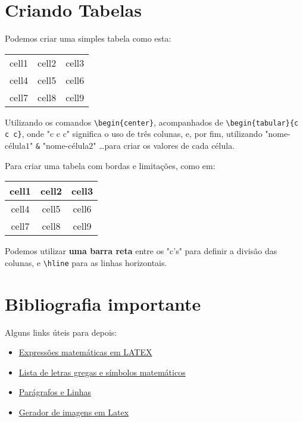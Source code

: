 \documentclass[12pt, a4paper]{article}
\begin{document}
\section{Criando Tabelas}
Podemos criar uma simples tabela como esta:
\begin{center}
\begin{tabular}{c c c}
 cell1 & cell2 & cell3 \\ 
 cell4 & cell5 & cell6 \\  
 cell7 & cell8 & cell9    
\end{tabular}
\end{center}
Utilizando os comandos \verb|\begin{center}|, acompanhados de \verb|\begin{tabular}{c c c}|, onde "c c c" significa o uso de três colunas, e, por fim, utilizando "nome-célula$1$" \verb|&| "nome-célula$2$" \dots \space para criar os valores de cada célula.

Para criar uma tabela com bordas e limitações, como em:
\begin{center}
\begin{tabular}{|c|c|c|} 
 \hline
 cell1 & cell2 & cell3 \\ 
 \hline
 cell4 & cell5 & cell6 \\ 
 \hline
 cell7 & cell8 & cell9 \\ 
 \hline
\end{tabular}
\end{center}
Podemos utilizar \textbf{uma barra reta} entre os "c's" para definir a divisão das colunas, e \verb|\hline| para as linhas horizontais.

\section{Bibliografia importante}
Alguns links úteis para depois:
\begin{itemize}
    \item \href{https://www.overleaf.com/learn/latex/Mathematical_expressions}{Expressões matemáticas em LATEX}
    \item \href{https://www.overleaf.com/learn/latex/List_of_Greek_letters_and_math_symbols}{Lista de letras gregas e símbolos matemáticos}
    \item \href{https://www.overleaf.com/learn/latex/Paragraphs_and_new_lines}{Parágrafos e Linhas}
    \item \href{https://www.tablesgenerator.com/}{Gerador de imagens em Latex}
\end{itemize}
\end{document}
